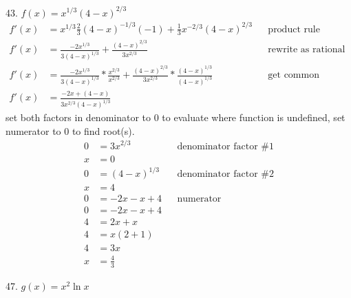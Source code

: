 \documentclass{article}
\begin{document}
\begin{description}
\begin{description}
              \item 43. $f(x) = x^{1/3}(4-x)^{2/3}$
                    \begin{align*}
                        f'(x) & = x^{1/3}\frac{2}{3} (4-x)^{-1/3}(-1) + \frac{1}{3}x^{-2/3}(4-x)^{2/3}                                                      &  & \text{product rule}                   \\[1em]
                        f'(x) & = \frac{-2x^{1/3}}{3(4-x)^{1/3}}  + \frac{(4-x)^{2/3}}{3x^{2/3}}                                                            &  & \text{rewrite as rational expression} \\[1em]
                        f'(x) & = \frac{-2x^{1/3}}{3(4-x)^{1/3}} * \frac{x^{2/3}}{x^{2/3}} + \frac{(4-x)^{2/3}}{3x^{2/3}} * \frac{(4-x)^{1/3}}{(4-x)^{1/3}} &  & \text{get common denominators}        \\[1em]
                        f'(x) & = \frac{-2x + (4-x)}{3x^{2/3}(4-x)^{1/3}}
                    \end{align*}
                    set both factors in denominator to 0 to evaluate where function is undefined, set numerator to 0 to find root(s).
                    \begin{align*}
                        0 & = 3x^{2/3}    &  & \text{denominator factor \#1} \\
                        x & = 0                                              \\[2em]
                        0 & = (4-x)^{1/3} &  & \text{denominator factor \#2} \\
                        x & = 4                                              \\[2em]
                        0 & = -2x - x + 4 &  & \text{numerator}              \\
                        0 & = -2x - x + 4                                    \\
                        4 & = 2x + x                                         \\
                        4 & = x(2 + 1)                                       \\
                        4 & = 3x                                             \\
                        x & = \frac{4}{3}
                    \end{align*}
              \item 47. $g(x) = x^2\ln{x}$

\end{description}
\end{description}
\end{document}
